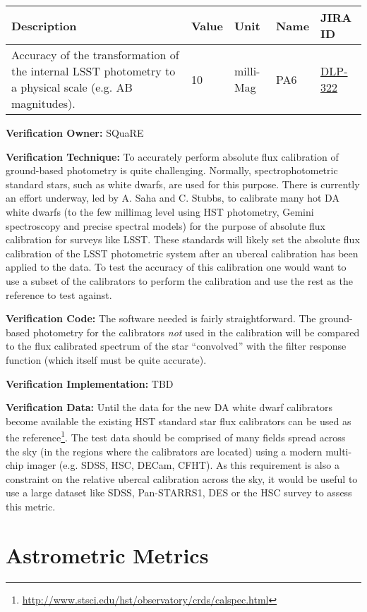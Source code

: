 \documentclass[DM,lsstdraft,toc]{lsstdoc}
\newcommand{\jira}[1]{\href{https://jira.lsstcorp.org/browse/#1}{#1}}
\begin{document}
\begin{longtable}[]{@{}p{}llll@{}}
\toprule
Description & Value & Unit & Name & JIRA ID\tabularnewline
\midrule
\endhead
Accuracy of the transformation of the internal LSST photometry to a
physical scale (e.g. AB magnitudes). & 10 & milli-Mag & PA6 &
\jira{DLP-322}\tabularnewline
\bottomrule
\end{longtable}

\textbf{Verification Owner:} SQuaRE

\textbf{Verification Technique:} To accurately perform absolute flux
calibration of ground-based photometry is quite challenging. Normally,
spectrophotometric standard stars, such as white dwarfs, are used for
this purpose. There is currently an effort underway, led by A. Saha and
C. Stubbs, to calibrate many hot DA white dwarfs (to the few millimag
level using HST photometry, Gemini spectroscopy and precise spectral
models) for the purpose of absolute flux calibration for surveys like
LSST. These standards will likely set the absolute flux calibration of
the LSST photometric system after an ubercal calibration has been
applied to the data. To test the accuracy of this calibration one would
want to use a subset of the calibrators to perform the calibration and
use the rest as the reference to test against.

\textbf{Verification Code:} The software needed is fairly
straightforward. The ground-based photometry for the calibrators
\emph{not} used in the calibration will be compared to the flux
calibrated spectrum of the star ``convolved'' with the filter response
function (which itself must be quite accurate).

\textbf{Verification Implementation:} TBD

\textbf{Verification Data:} Until the data for the new DA white dwarf
calibrators become available the existing HST standard star flux
calibrators can be used as the reference\footnote{\url{http://www.stsci.edu/hst/observatory/crds/calspec.html}}.\protect\hypertarget{_Toc301352570}{}{}
The test data should be comprised of many fields spread across the sky
(in the regions where the calibrators are located) using a modern
multi-chip imager (e.g. SDSS, HSC, DECam, CFHT). As this requirement is
also a constraint on the relative ubercal calibration across the sky, it
would be useful to use a large dataset like SDSS, Pan-STARRS1, DES or
the HSC survey to assess this metric.

\section{Astrometric Metrics}\label{astrometric-metrics}
\end{document}
